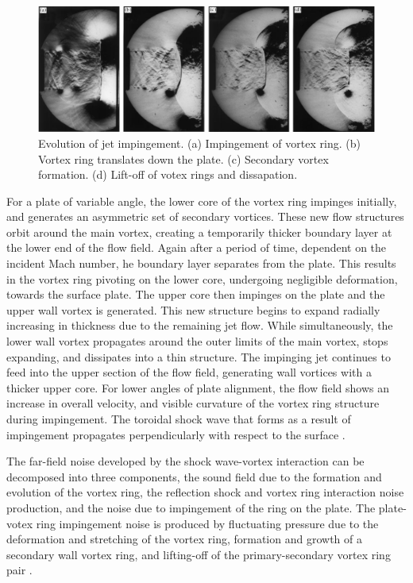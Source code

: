 \begin{figure}[h] 
	\centering
	\includegraphics[scale=0.9]{fig4.PNG} 
	\caption{Evolution of jet impingement. (a) Impingement of vortex ring. (b) Vortex ring translates down the plate. (c) Secondary vortex formation. (d) Lift-off of votex rings and dissapation. \cite{szumowski2000}}
	\label{fig:4}
\end{figure}
For a plate of variable angle, the lower core of the vortex ring impinges initially, and generates an asymmetric set of secondary vortices. These new flow structures orbit around the main vortex, creating a temporarily thicker boundary layer at the lower end of the flow field. Again after a period of time, dependent on the incident Mach number, he boundary layer separates from the plate. This results in the vortex ring pivoting on the lower core, undergoing negligible deformation, towards the surface plate. The upper core then impinges on the plate and the upper wall vortex is generated. This new structure begins to expand radially increasing in thickness due to the remaining jet flow. While simultaneously, the lower wall vortex propagates around the outer limits of the main vortex, stops expanding, and dissipates into a  thin structure. The impinging jet continues to feed into the upper section of the flow field, generating  wall vortices with a thicker upper core. For lower angles of plate alignment, the flow field shows an increase in overall velocity, and visible curvature of the vortex ring structure during impingement. The toroidal shock wave that forms as a result of impingement propagates perpendicularly with respect to the surface \cite{mariani2013}.  

The far-field noise developed by the shock wave-vortex interaction can be decomposed into three components, the sound field due to the formation and evolution of the vortex ring, the reflection shock and vortex ring interaction noise production, and the noise due to impingement of the ring on the plate. The plate-votex ring impingement noise is produced by fluctuating pressure due to the deformation and stretching of the vortex ring, formation and growth of a secondary wall vortex ring, and lifting-off of the primary-secondary vortex ring pair \cite{murugan2010}.

